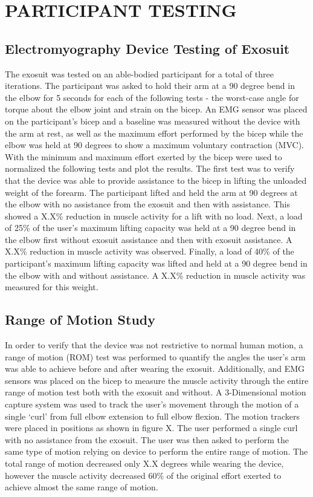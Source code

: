 \documentclass[letterpaper, 10 pt, conference]{ieeeconf}  %
\begin{document}
\section{PARTICIPANT TESTING}

\subsection{Electromyography Device Testing of Exosuit}
The exosuit was tested on an able-bodied participant for a total of three iterations.  The participant was asked to hold their arm at a 90 degree bend in the elbow for 5 seconds for each of the following tests - the worst-case angle for torque about the elbow joint and strain on the bicep.  An EMG sensor was placed on the participant’s bicep and a baseline was measured without the device with the arm at rest, as well as the maximum effort performed by the bicep while the elbow was held at 90 degrees to show a maximum voluntary contraction (MVC).  With the minimum and maximum effort exerted by the bicep were used to normalized the following tests and plot the results.   The first test was to verify that the device was able to provide assistance to the bicep in lifting the unloaded weight of the forearm.  The participant lifted and held the arm at 90 degrees at the elbow with no assistance from the exosuit and then with assistance.  This showed a X.X\% reduction in muscle activity for a lift with no load.  Next, a load of 25\% of the user’s maximum lifting capacity was held at a 90 degree bend in the elbow first without exosuit assistance and then with exosuit assistance.  A X.X\% reduction in muscle activity was observed.  Finally, a load of 40\% of the participant’s maximum lifting capacity was lifted and held at a 90 degree bend in the elbow with and without assistance.  A X.X\% reduction in muscle activity was measured for this weight.  


\subsection{Range of Motion Study}
In order to verify that the device was not restrictive to normal human motion, a range of motion (ROM) test was performed to quantify the angles the user’s arm was able to achieve before and after wearing the exosuit.   Additionally, and EMG sensors was placed on the bicep to measure the muscle activity through the entire range of motion test both with the exosuit and without.  A 3-Dimensional motion capture system was used to track the user’s movement through the motion of a single ‘curl’ from full elbow extension to full elbow flexion.  The motion trackers were placed in positions as shown in  figure X.  The user performed a single curl with no assistance from the exosuit.  The user was then asked to perform the same type of motion relying on device to perform the entire range of motion.  The total range of motion decreased only X.X degrees while wearing the device, however the muscle activity decreased 60\% of the original effort exerted to achieve almost the same range of motion.      
\end{document}
